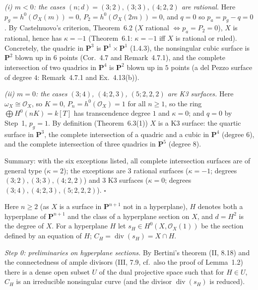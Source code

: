 \documentclass[11pt]{article}
\begin{document}
\emph{(i) $m<0$: the cases $(n;d)=(3;2),(3;3),(4;2,2)$ are rational.} Here $p_g=h^0(\mathcal O_X(m))=0$, $P_2=h^0(\mathcal O_X(2m))=0$, and $q=0$ so $p_a=p_g-q=0$. By Castelnuovo's criterion, Theorem~6.2 ($X$ rational $\iff p_a=P_2=0$), $X$ is rational, hence has $\kappa=-1$ (Theorem~6.1: $\kappa=-1$ iff $X$ is rational or ruled). Concretely, the quadric in $\mathbf P^3$ is $\mathbf P^1\times\mathbf P^1$ (1.4.3), the nonsingular cubic surface is $\mathbf P^2$ blown up in $6$ points (Cor.~4.7 and Remark~4.7.1), and the complete intersection of two quadrics in $\mathbf P^4$ is $\mathbf P^2$ blown up in $5$ points (a del Pezzo surface of degree $4$: Remark~4.7.1 and Ex.~4.13(b)).

\emph{(ii) $m=0$: the cases $(3;4)$, $(4;2,3)$, $(5;2,2,2)$ are K3 surfaces.} Here $\omega_X\cong\mathcal O_X$, so $K=0$, $P_n=h^0(\mathcal O_X)=1$ for all $n\ge1$, so the ring $\bigoplus H^0(nK)=k[T]$ has transcendence degree $1$ and $\kappa=0$; and $q=0$ by Step~1, $p_g=1$. By definition (Theorem~6.3(1)) $X$ is a K3 surface: the quartic surface in $\mathbf P^3$, the complete intersection of a quadric and a cubic in $\mathbf P^4$ (degree $6$), and the complete intersection of three quadrics in $\mathbf P^5$ (degree $8$).

Summary: with the six exceptions listed, all complete intersection surfaces are of general type ($\kappa=2$); the exceptions are $3$ rational surfaces ($\kappa=-1$; degrees $(3;2),(3;3),(4;2,2)$) and $3$ K3 surfaces ($\kappa=0$; degrees $(3;4),(4;2,3),(5;2,2,2)$). \hfill$\square$

\pf
Here $n\ge2$ (as $X$ is a surface in $\mathbf P^{n+1}$ not in a hyperplane), $H$ denotes both a hyperplane of $\mathbf P^{n+1}$ and the class of a hyperplane section on $X$, and $d=H^2$ is the degree of $X$. For a hyperplane $H$ let $s_H\in H^0(X,\mathcal O_X(1))$ be the section defined by an equation of $H$; $C_H=\operatorname{div}(s_H)=X\cap H$.

\emph{Step 0: preliminaries on hyperplane sections.} By Bertini's theorem (II, 8.18) and the connectedness of ample divisors (III, 7.9, cf.\ also the proof of Lemma~1.2) there is a dense open subset $U$ of the dual projective space such that for $H\in U$, $C_H$ is an irreducible nonsingular curve (and the divisor $\operatorname{div}(s_H)$ is reduced).
\end{document}
